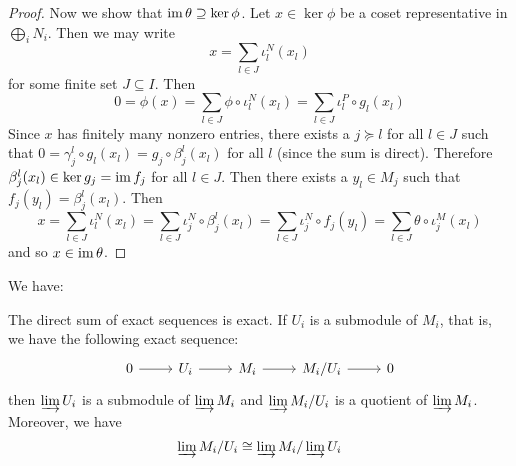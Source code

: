 \begin{proof}
	Now we show that $\operatorname{im}\theta \supseteq \ker\phi$.
	Let $x \in \ker\phi$ be a coset representative in $\bigoplus_i N_i$.
	Then we may write
	\[x=\sum_{l\in J} \iota_l^N(x_l)\]
	for some finite set $J \subseteq I$.
	Then
	\[0=\phi(x) = \sum_{l \in J} \phi\circ\iota_l^N (x_l) = \sum_{l \in J} \iota_l^P\circ g_l(x_l)\]
	Since $x$ has finitely many nonzero entries, there exists a $j \succeq l$ for all $l \in J$ such that $0 = \gamma_j^l\circ g_l(x_l) = g_j\circ\beta_j^l(x_l)$ for all $l$ (since the sum is direct).
	Therefore $\beta_j^l(x_l) \in \ker g_j = \operatorname{im} f_j$ for all $l \in J$.
	Then there exists a $y_l \in M_j$ such that $f_j(y_l) = \beta_j^l(x_l)$.
	Then
	\[x = \sum_{l\in J} \iota_l^N(x_l) = \sum_{l \in J} \iota_j^N\circ\beta_j^l(x_l) = \sum_{l \in J} \iota_j^N \circ f_j(y_l) = \sum_{l \in J} \theta\circ\iota_j^M(x_l)\]
	and so $x \in \operatorname{im}\theta$.
\end{proof}

\begin{rmk}
	We have:
	\begin{enum}
		\io The direct sum of exact sequences is exact.
		\io If $U_i$ is a submodule of $M_i$, that is, we have the following exact sequence:
		\[\begin{tikzcd}
			0 \ar[r] & U_i \ar[r] & M_i \ar[r] & M_i/U_i \ar[r] & 0
		\end{tikzcd}\]
		then $\varinjlim U_i$ is a submodule of $\varinjlim M_i$ and $\varinjlim M_i/U_i$ is a quotient of $\varinjlim M_i$.
		Moreover, we have
		\[\varinjlim M_i/U_i \cong \varinjlim M_i / \varinjlim U_i\]
	\end{enum}
\end{rmk}

